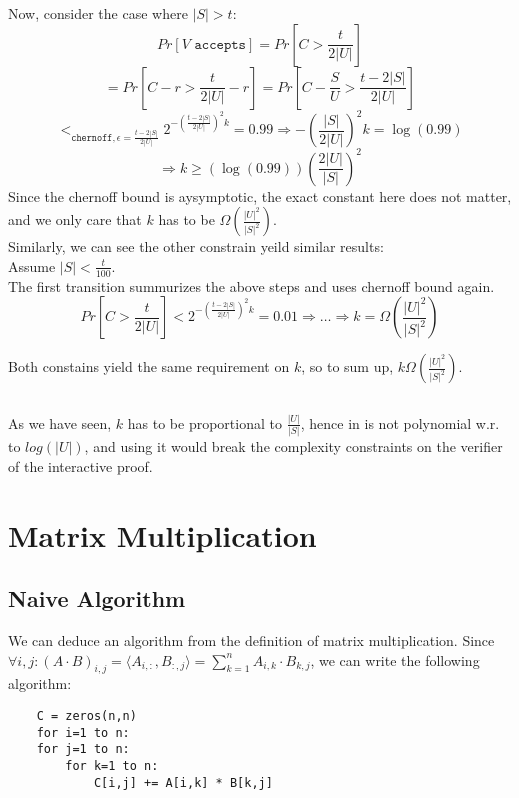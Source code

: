 \documentclass{article}
\begin{document}
Now, consider the case where $|S|>t$:\\
\[
    Pr[V\texttt{ accepts}]
    =Pr[C>\frac{t}{2|U|}]
\]\[
    =Pr[C-r>\frac{t}{2|U|}-r]
    =Pr[C-\frac{S}{U}>\frac{t-2|S|}{2|U|}]
\]\[
    <_{\texttt{chernoff}, \epsilon=\frac{t-2|S|}{2|U|}}
    2^{-(\frac{t-2|S|}{2|U|})^2k}=0.99
    \Rightarrow -(\frac{|S|}{2|U|})^2k=\log(0.99)
\]\[
    \Rightarrow k\geq (\log(0.99))(\frac{2|U|}{|S|})^2
\]
Since the chernoff bound is aysymptotic, the exact constant here does
not matter, and we only care that $k$ has to be $\Omega(\frac{|U|^2}{|S|^2})$.\\

Similarly, we can see the other constrain yeild similar results:\\
Assume $|S|<\frac{t}{100}$.\\
The first transition summurizes the above steps and uses chernoff bound again.
\[
    Pr[C>\frac{t}{2|U|}]<2^{-(\frac{t-2|S|}{2|U|})^2k}=0.01
    \Rightarrow \dots \Rightarrow k=\Omega(\frac{|U|^2}{|S|^2})
\]

Both constains yield the same requirement on $k$, so to sum up,
$k\Omega(\frac{|U|^2}{|S|^2})$.

\subsection{}
As we have seen, $k$ has to be proportional to $\frac{|U|}{|S|}$,
hence in is not polynomial w.r. to $log(|U|)$, and using it would
break the complexity constraints on the verifier of the interactive proof.


\section{Matrix Multiplication}
\subsection{Naive Algorithm}
We can deduce an algorithm from the definition of matrix multiplication.
Since $\forall i,j: (A\cdot B)_{i,j}=\langle A_{i,:},B_{:,j}\rangle =\sum_{k=1}^nA_{i,k}\cdot B_{k,j}$,
we can write the following algorithm:
\begin{lstlisting}
    C = zeros(n,n)
    for i=1 to n:
    for j=1 to n:
        for k=1 to n:
            C[i,j] += A[i,k] * B[k,j]
\end{lstlisting}
\end{document}
